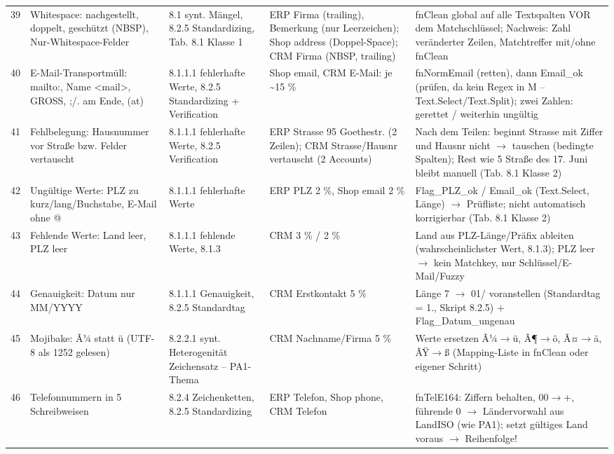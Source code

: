 \begin{landscape}
\begin{small}
\begin{longtable}{@{}r p{3.4cm} p{2.6cm} p{5.2cm} p{7.4cm}@{}}
39 & Whitespace: nachgestellt, doppelt, geschützt (NBSP), Nur-Whitespace-Felder & 8.1 synt. Mängel, 8.2.5 Standardizing, Tab. 8.1 Klasse 1 & ERP Firma (trailing), Bemerkung (nur Leerzeichen); Shop address (Doppel-Space); CRM Firma (NBSP, trailing) & fnClean global auf alle Textspalten VOR dem Matchschlüssel; Nachweis: Zahl veränderter Zeilen, Matchtreffer mit/ohne fnClean\\[2pt]
40 & E-Mail-Transportmüll: mailto:, \glqq{}Name \textless{}mail\textgreater{}\grqq{}, GROSS, ;/. am Ende, (at) & 8.1.1.1 fehlerhafte Werte, 8.2.5 Standardizing + Verification & Shop email, CRM E-Mail: je \textasciitilde{}15 \% & fnNormEmail (retten), dann Email\_ok (prüfen, da kein Regex in M – Text.Select/Text.Split); zwei Zahlen: gerettet / weiterhin ungültig\\[2pt]
41 & Fehlbelegung: Hausnummer vor Straße bzw. Felder vertauscht & 8.1.1.1 fehlerhafte Werte, 8.2.5 Verification & ERP Strasse \glqq{}95 Goethestr.\grqq{} (2 Zeilen); CRM Strasse/Hausnr vertauscht (2 Accounts) & Nach dem Teilen: beginnt Strasse mit Ziffer und Hausnr nicht $\rightarrow$ tauschen (bedingte Spalten); Rest wie \glqq{}5 Straße des 17. Juni\grqq{} bleibt manuell (Tab. 8.1 Klasse 2)\\[2pt]
42 & Ungültige Werte: PLZ zu kurz/lang/Buchstabe, E-Mail ohne @ & 8.1.1.1 fehlerhafte Werte & ERP PLZ 2 \%, Shop email 2 \% & Flag\_PLZ\_ok / Email\_ok (Text.Select, Länge) $\rightarrow$ Prüfliste; nicht automatisch korrigierbar (Tab. 8.1 Klasse 2)\\[2pt]
43 & Fehlende Werte: Land leer, PLZ leer & 8.1.1.1 fehlende Werte, 8.1.3 & CRM 3 \% / 2 \% & Land aus PLZ-Länge/Präfix ableiten (wahrscheinlichster Wert, 8.1.3); PLZ leer $\rightarrow$ kein Matchkey, nur Schlüssel/E-Mail/Fuzzy\\[2pt]
44 & Genauigkeit: Datum nur MM/YYYY & 8.1.1.1 Genauigkeit, 8.2.5 Standardtag & CRM Erstkontakt 5 \% & Länge 7 $\rightarrow$ \grqq{}01/\grqq{} voranstellen (Standardtag = 1., Skript 8.2.5) + Flag\_Datum\_ungenau\\[2pt]
45 & Mojibake: Ã¼ statt ü (UTF-8 als 1252 gelesen) & 8.2.2.1 synt. Heterogenität Zeichensatz – PA1-Thema & CRM Nachname/Firma 5 \% & Werte ersetzen Ã¼$\rightarrow$ü, Ã¶$\rightarrow$ö, Ã¤$\rightarrow$ä, ÃŸ$\rightarrow$ß (Mapping-Liste in fnClean oder eigener Schritt)\\[2pt]
46 & Telefonnummern in 5 Schreibweisen & 8.2.4 Zeichenketten, 8.2.5 Standardizing & ERP Telefon, Shop phone, CRM Telefon & fnTelE164: Ziffern behalten, 00$\rightarrow$+, führende 0 $\rightarrow$ Ländervorwahl aus LandISO (wie PA1); setzt gültiges Land voraus $\rightarrow$ Reihenfolge!\\[2pt]

\end{longtable}
\end{small}
\end{landscape}

